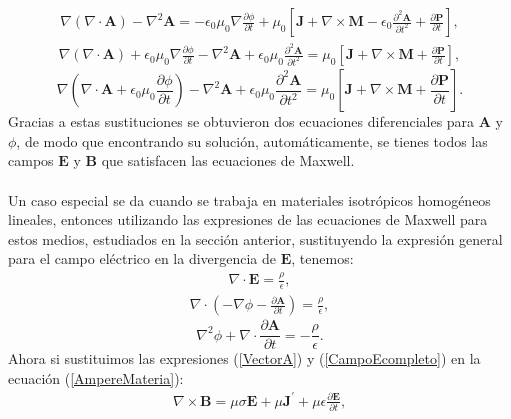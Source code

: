\documentclass[11pt,fleqn]{book} %
\begin{document}
\begin{eqnarray*}
\nabla(\nabla \cdot \textbf{A})-\nabla^{2} \textbf{A}=-\epsilon_{0}\mu_{0}\nabla\frac{\partial \phi}{\partial t}+\mu_{0}\left[\textbf{J}+\nabla \times \textbf{M}-\epsilon_{0}\frac{\partial^{2} \textbf{A}}{\partial t^{2}} +\frac{\partial \textbf{P}}{\partial t} \right],
\end{eqnarray*}
\begin{eqnarray*}
\nabla(\nabla \cdot \textbf{A})+\epsilon_{0}\mu_{0}\nabla\frac{\partial \phi}{\partial t}-\nabla^{2} \textbf{A}+\epsilon_{0}\mu_{0}\frac{\partial^{2} \textbf{A}}{\partial t^{2}}=\mu_{0}\left[\textbf{J}+\nabla \times \textbf{M} +\frac{\partial \textbf{P}}{\partial t} \right],
\end{eqnarray*}
\begin{equation}
\nabla\left(\nabla \cdot \textbf{A}+\epsilon_{0}\mu_{0}\frac{\partial \phi}{\partial t}\right)-\nabla^{2} \textbf{A}+\epsilon_{0}\mu_{0}\frac{\partial^{2} \textbf{A}}{\partial t^{2}}=\mu_{0}\left[\textbf{J}+\nabla \times \textbf{M}+\frac{\partial \textbf{P}}{\partial t} \right].  \label{EcuacionA}
\end{equation}
Gracias a estas sustituciones se obtuvieron dos ecuaciones diferenciales para $\textbf{A}$ y $\phi$, de modo que encontrando su soluci\'on, autom\'aticamente, se tienes todos las campos $\textbf{E}$ y $\textbf{B}$ que satisfacen las ecuaciones de Maxwell.\cite{Wangness2001} \\\\
Un caso especial se da cuando se trabaja en materiales isotr\'opicos homog\'eneos lineales, entonces utilizando las expresiones de las ecuaciones de Maxwell para estos medios, estudiados en la secci\'on anterior, sustituyendo la expresi\'on general para el campo el\'ectrico en la divergencia de $\textbf{E}$, tenemos:
\begin{eqnarray*}
\nabla\cdot\textbf{E}=\frac{\rho}{\epsilon},
\end{eqnarray*}
\begin{eqnarray*}
\nabla\cdot\left(-\nabla\phi-\frac{\partial \textbf{A}}{\partial t}\right)=\frac{\rho}{\epsilon},
\end{eqnarray*}
\begin{equation}
\nabla^{2}\phi+\nabla\cdot\frac{\partial \textbf{A}}{\partial t}=-\frac{\rho}{\epsilon}. \label{Ec. potencial}
\end{equation}
Ahora si sustituimos las expresiones (\ref{VectorA}) y (\ref{CampoEcompleto}) en la ecuaci\'on (\ref{AmpereMateria}):
\begin{eqnarray*}
\nabla \times \textbf{B}=\mu\sigma\textbf{E}+\mu\textbf{J}^{'}+\mu\epsilon\frac{\partial \textbf{E}}{\partial t},
\end{eqnarray*}
\end{document}
